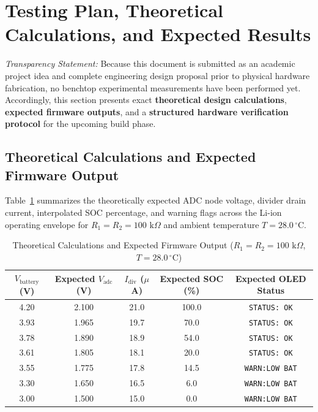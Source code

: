 \documentclass[12pt,a4paper]{article}
\begin{document}
\section{Testing Plan, Theoretical Calculations, and Expected Results}
\label{sec:testing_results}

\textit{Transparency Statement:} Because this document is submitted as an academic project idea and complete engineering design proposal prior to physical hardware fabrication, no benchtop experimental measurements have been performed yet. Accordingly, this section presents exact \textbf{theoretical design calculations}, \textbf{expected firmware outputs}, and a \textbf{structured hardware verification protocol} for the upcoming build phase.

\subsection{Theoretical Calculations and Expected Firmware Output}
Table~\ref{tab:theoretical_calc} summarizes the theoretically expected ADC node voltage, divider drain current, interpolated SOC percentage, and warning flags across the Li-ion operating envelope for $R_1 = R_2 = 100\text{ k}\Omega$ and ambient temperature $T = 28.0\,^\circ\text{C}$.

\begin{table}[H]
\centering


\renewcommand{\arraystretch}{1.2}
\begin{tabular}{|@{}c|c|c|c|c@{}|}
\hline
\textbf{$V_{\text{battery}}$ (V)} & \textbf{Expected $V_{\text{adc}}$ (V)} & \textbf{$I_{\text{div}}$ ($\mu$A)} & \textbf{Expected SOC (\%)} & \textbf{Expected OLED Status} \\
\hline
4.20 & 2.100 & 21.0 & 100.0 & \texttt{STATUS: OK} \\\hline
3.93 & 1.965 & 19.7 & 70.0  & \texttt{STATUS: OK} \\\hline
3.78 & 1.890 & 18.9 & 54.0  & \texttt{STATUS: OK} \\\hline
3.61 & 1.805 & 18.1 & 20.0  & \texttt{STATUS: OK} \\\hline
3.55 & 1.775 & 17.8 & 14.5  & \texttt{WARN:LOW BAT} \\\hline
3.30 & 1.650 & 16.5 & 6.0   & \texttt{WARN:LOW BAT} \\\hline
3.00 & 1.500 & 15.0 & 0.0   & \texttt{WARN:LOW BAT} \\
\hline
\end{tabular}
\caption{Theoretical Calculations and Expected Firmware Output ($R_1 = R_2 = 100\text{ k}\Omega$, $T = 28.0\,^\circ\text{C}$)}
\label{tab:theoretical_calc}
\end{table}
\end{document}
